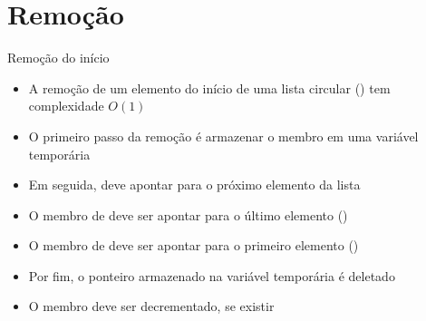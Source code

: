 \section{Remoção}

\begin{frame}[fragile]{Remoção do início}

    \begin{itemize}
        \item A remoção de um elemento do início de uma lista circular
        () tem complexidade $O(1)$

        \item O primeiro passo da remoção é armazenar o membro  em uma 
            variável temporária

        \item Em seguida,  deve apontar para o próximo elemento da
            lista

        \item O membro  de  deve ser apontar para o último elemento
            ()

        \item O membro  de  deve ser apontar para o primeiro elemento
            ()

        \item Por fim, o ponteiro armazenado na variável temporária é deletado

        \item O membro  deve ser decrementado, se existir
    \end{itemize}

\end{frame}

